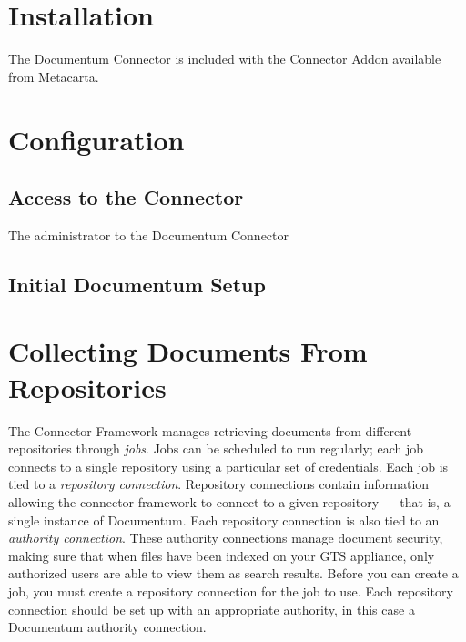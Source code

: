 \begin{changemargin}{1.5in}{0in}

\section{Installation}

The Documentum Connector is included with the Connector Addon
available from Metacarta. 

\section{Configuration}

\subsection{Access to the Connector}

The administrator to the Documentum Connector 

\subsection{Initial Documentum Setup}





\section{Collecting Documents From Repositories} %

The Connector Framework manages retrieving documents from different
repositories through \emph{jobs}. Jobs can be scheduled to run
regularly; each job connects to a single repository using a particular
set of credentials. Each job is tied to a \emph{repository
connection}. Repository connections contain information allowing the
connector framework to connect to a given repository --- that is, a
single instance of Documentum. Each repository connection is also tied
to an \emph{authority connection}. These authority connections manage
document security, making sure that when files have been indexed on
your GTS appliance, only authorized users are able to view them as
search results. Before you can create a job, you must create a
repository connection for the job to use. Each repository connection
should be set up with an appropriate authority, in this case a
Documentum authority connection. 


\end{changemargin}

